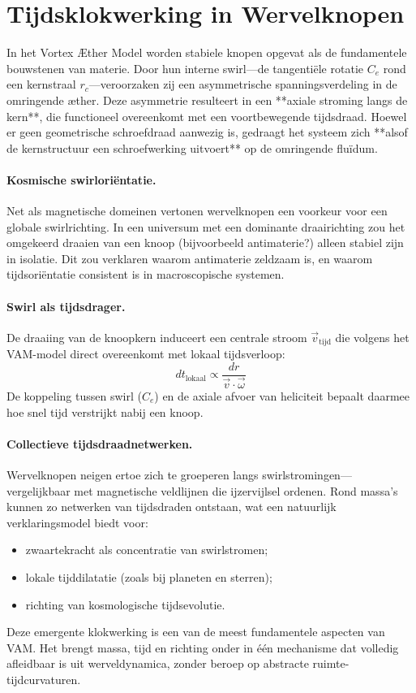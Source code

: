 \section{Tijdsklokwerking in Wervelknopen}

In het Vortex Æther Model worden stabiele knopen opgevat als de fundamentele bouwstenen van materie. Door hun interne swirl—de tangentiële rotatie \( C_e \) rond een kernstraal \( r_c \)—veroorzaken zij een asymmetrische spanningsverdeling in de omringende æther. Deze asymmetrie resulteert in een **axiale stroming langs de kern**, die functioneel overeenkomt met een voortbewegende tijdsdraad. Hoewel er geen geometrische schroefdraad aanwezig is, gedraagt het systeem zich **alsof de kernstructuur een schroefwerking uitvoert** op de omringende fluïdum.

\paragraph{Kosmische swirloriëntatie.}
Net als magnetische domeinen vertonen wervelknopen een voorkeur voor een globale swirlrichting. In een universum met een dominante draairichting zou het omgekeerd draaien van een knoop (bijvoorbeeld antimaterie?) alleen stabiel zijn in isolatie. Dit zou verklaren waarom antimaterie zeldzaam is, en waarom tijdsoriëntatie consistent is in macroscopische systemen.

\paragraph{Swirl als tijdsdrager.}
De draaiing van de knoopkern induceert een centrale stroom \( \vec{v}_\text{tijd} \) die volgens het VAM-model direct overeenkomt met lokaal tijdsverloop:
\[
    dt_\text{lokaal} \propto \frac{dr}{\vec{v} \cdot \vec{\omega}}
\]
De koppeling tussen swirl (\( C_e \)) en de axiale afvoer van heliciteit bepaalt daarmee hoe snel tijd verstrijkt nabij een knoop.

\paragraph{Collectieve tijdsdraadnetwerken.}
Wervelknopen neigen ertoe zich te groeperen langs swirlstromingen—vergelijkbaar met magnetische veldlijnen die ijzervijlsel ordenen. Rond massa’s kunnen zo netwerken van tijdsdraden ontstaan, wat een natuurlijk verklaringsmodel biedt voor:
\begin{itemize}
    \item zwaartekracht als concentratie van swirlstromen;
    \item lokale tijddilatatie (zoals bij planeten en sterren);
    \item richting van kosmologische tijdsevolutie.
\end{itemize}

Deze emergente klokwerking is een van de meest fundamentele aspecten van VAM. Het brengt massa, tijd en richting onder in één mechanisme dat volledig afleidbaar is uit werveldynamica, zonder beroep op abstracte ruimte-tijdcurvaturen.